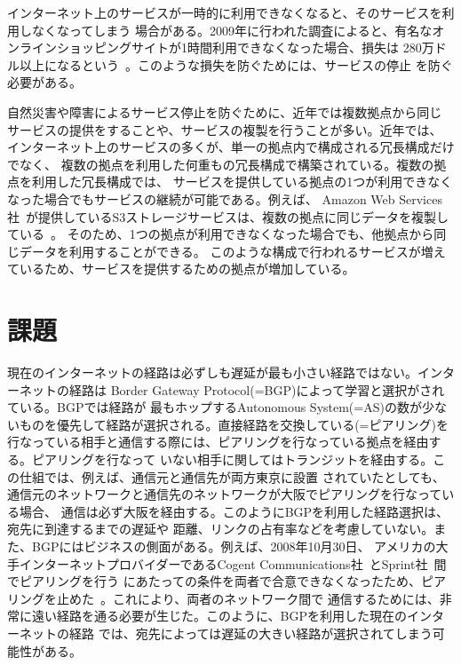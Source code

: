インターネット上のサービスが一時的に利用できなくなると、そのサービスを利用しなくなってしまう
場合がある。2009年に行われた調査によると、有名なオンラインショッピングサイトが1時間利用できなくなった場合、損失は
280万ドル以上になるという~\cite{acm:sigops}。このような損失を防ぐためには、サービスの停止
を防ぐ必要がある。

自然災害や障害によるサービス停止を防ぐために、近年では複数拠点から同じ
サービスの提供をすることや、サービスの複製を行うことが多い。近年では、
インターネット上のサービスの多くが、単一の拠点内で構成される冗長構成だけでなく、
複数の拠点を利用した何重もの冗長構成で構築されている。複数の拠点を利用した冗長構成では、
サービスを提供している拠点の1つが利用できなくなった場合でもサービスの継続が可能である。例えば、
Amazon Web Services社~\cite{aws}が提供しているS3ストレージサービスは、複数の拠点に同じデータを複製している~\cite{awswhite}。
そのため、1つの拠点が利用できなくなった場合でも、他拠点から同じデータを利用することができる。
このような構成で行われるサービスが増えているため、サービスを提供するための拠点が増加している。

\section{課題}
\label{background:internetroute}

現在のインターネットの経路は必ずしも遅延が最も小さい経路ではない。インターネットの経路は
Border Gateway Protocol(=BGP)によって学習と選択がされている。BGPでは経路が
最もホップするAutonomous System(=AS)の数が少ないものを優先して経路が選択される。直接経路を交換している(=ピアリング)を
行なっている相手と通信する際には、ピアリングを行なっている拠点を経由する。ピアリングを行なって
いない相手に関してはトランジットを経由する。この仕組では、例えば、通信元と通信先が両方東京に設置
されていたとしても、通信元のネットワークと通信先のネットワークが大阪でピアリングを行なっている場合、
通信は必ず大阪を経由する。このようにBGPを利用した経路選択は、宛先に到達するまでの遅延や
距離、リンクの占有率などを考慮していない。また、BGPにはビジネスの側面がある。例えば、2008年10月30日、
アメリカの大手インターネットプロバイダーであるCogent Communications社~\cite{cogent}とSprint社~\cite{sprint}間でピアリングを行う
にあたっての条件を両者で合意できなくなったため、ピアリングを止めた~\cite{cogentpeering}。これにより、両者のネットワーク間で
通信するためには、非常に遠い経路を通る必要が生じた。このように、BGPを利用した現在のインターネットの経路
では、宛先によっては遅延の大きい経路が選択されてしまう可能性がある。

